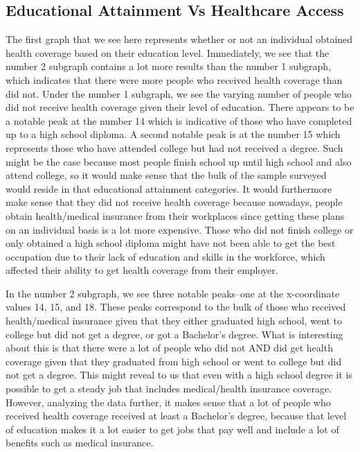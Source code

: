 \documentclass[10pt,]{article}
\begin{document}
\subsection{\texorpdfstring{\textbf{Educational Attainment Vs Healthcare
Access}}{Educational Attainment Vs Healthcare Access}}\label{educational-attainment-vs-healthcare-access-1}

The first graph that we see here represents whether or not an individual
obtained health coverage based on their education level. Immediately, we
see that the number 2 subgraph contains a lot more results than the
number 1 subgraph, which indicates that there were more people who
received health coverage than did not. Under the number 1 subgraph, we
see the varying number of people who did not receive health coverage
given their level of education. There appears to be a notable peak at
the number 14 which is indicative of those who have completed up to a
high school diploma. A second notable peak is at the number 15 which
represents those who have attended college but had not received a
degree. Such might be the case because most people finish school up
until high school and also attend college, so it would make sense that
the bulk of the sample surveyed would reside in that educational
attainment categories. It would furthermore make sense that they did not
receive health coverage because nowadays, people obtain health/medical
insurance from their workplaces since getting these plans on an
individual basis is a lot more expensive. Those who did not finish
college or only obtained a high school diploma might have not been able
to get the best occupation due to their lack of education and skills in
the workforce, which affected their ability to get health coverage from
their employer.

In the number 2 subgraph, we see three notable peaks--one at the
x-coordinate values 14, 15, and 18. These peaks correspond to the bulk
of those who received health/medical insurance given that they either
graduated high school, went to college but did not get a degree, or got
a Bachelor's degree. What is interesting about this is that there were a
lot of people who did not AND did get health coverage given that they
graduated from high school or went to college but did not get a degree.
This might reveal to us that even with a high school degree it is
possible to get a steady job that includes medical/health insurance
coverage. However, analyzing the data further, it makes sense that a lot
of people who received health coverage received at least a Bachelor's
degree, because that level of education makes it a lot easier to get
jobs that pay well and include a lot of benefits such as medical
insurance.
\end{document}
